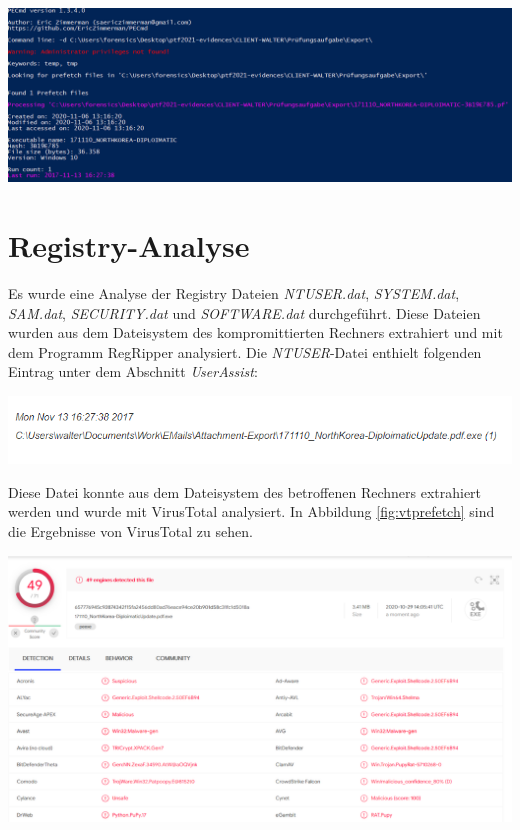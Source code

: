 \begin{center}
	\includegraphics[width=15.8cm]{figures/prefetch.png}
	\label{fig:prefetch}
\end{center}

\section{Registry-Analyse}
Es wurde eine Analyse der Registry Dateien \textit{NTUSER.dat}, \textit{SYSTEM.dat}, \textit{SAM.dat}, \textit{SECURITY.dat} und \textit{SOFTWARE.dat} durchgeführt. Diese Dateien wurden aus dem Dateisystem des kompromittierten Rechners extrahiert und mit dem Programm RegRipper analysiert.
Die \textit{NTUSER}-Datei enthielt folgenden Eintrag unter dem Abschnitt \textit{UserAssist}:
\\
\begin{center}
	\includegraphics[width=15.8cm]{figures/prefetch_path.png}
	\label{fig:prefetch_path}
\end{center}
\newpage
Diese Datei konnte aus dem Dateisystem des betroffenen Rechners extrahiert werden und wurde mit VirusTotal analysiert. In Abbildung \ref{fig:vtprefetch}  sind die Ergebnisse von VirusTotal zu sehen.

\begin{center}
	\includegraphics[width=15.8cm]{figures/virustotal_prefetch.png}
	\label{fig:vtprefetch}
\end{center}


